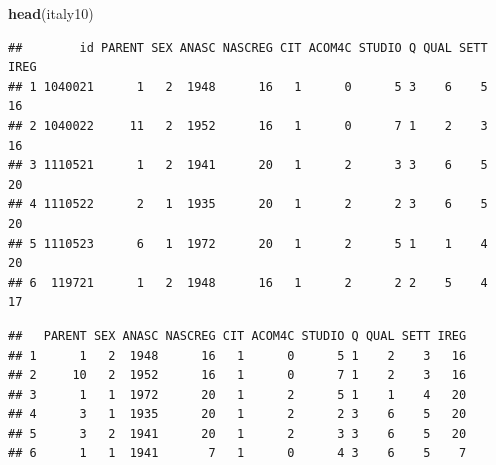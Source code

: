 \documentclass[
]{article}
\newenvironment{Shaded}{\begin{snugshade}}{\end{snugshade}}
\newcommand{\CommentTok}[1]{\textcolor[rgb]{0.56,0.35,0.01}{\textit{#1}}}
\newcommand{\DecValTok}[1]{\textcolor[rgb]{0.00,0.00,0.81}{#1}}
\newcommand{\FunctionTok}[1]{\textcolor[rgb]{0.13,0.29,0.53}{\textbf{#1}}}
\newcommand{\NormalTok}[1]{#1}
\newcommand{\OtherTok}[1]{\textcolor[rgb]{0.56,0.35,0.01}{#1}}
\newcommand{\SpecialCharTok}[1]{\textcolor[rgb]{0.81,0.36,0.00}{\textbf{#1}}}
\begin{document}
\begin{Shaded}
\begin{Highlighting}[]
\FunctionTok{head}\NormalTok{(italy10)}
\end{Highlighting}
\end{Shaded}

\begin{verbatim}
##        id PARENT SEX ANASC NASCREG CIT ACOM4C STUDIO Q QUAL SETT IREG
## 1 1040021      1   2  1948      16   1      0      5 3    6    5   16
## 2 1040022     11   2  1952      16   1      0      7 1    2    3   16
## 3 1110521      1   2  1941      20   1      2      3 3    6    5   20
## 4 1110522      2   1  1935      20   1      2      2 3    6    5   20
## 5 1110523      6   1  1972      20   1      2      5 1    1    4   20
## 6  119721      1   2  1948      16   1      2      2 2    5    4   17
\end{verbatim}

\begin{Shaded}
\end{Shaded}

\begin{verbatim}
##   PARENT SEX ANASC NASCREG CIT ACOM4C STUDIO Q QUAL SETT IREG
## 1      1   2  1948      16   1      0      5 1    2    3   16
## 2     10   2  1952      16   1      0      7 1    2    3   16
## 3      1   1  1972      20   1      2      5 1    1    4   20
## 4      3   1  1935      20   1      2      2 3    6    5   20
## 5      3   2  1941      20   1      2      3 3    6    5   20
## 6      1   1  1941       7   1      0      4 3    6    5    7
\end{verbatim}
\end{document}
